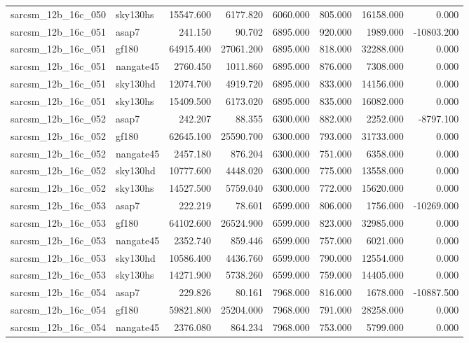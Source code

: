 \begin{tabular}{llrrrrrr}
sarcsm\_12b\_16c\_050 & sky130hs & 15547.600 & 6177.820 & 6060.000 & 805.000 & 16158.000 & 0.000 \\
sarcsm\_12b\_16c\_051 & asap7 & 241.150 & 90.702 & 6895.000 & 920.000 & 1989.000 & -10803.200 \\
sarcsm\_12b\_16c\_051 & gf180 & 64915.400 & 27061.200 & 6895.000 & 818.000 & 32288.000 & 0.000 \\
sarcsm\_12b\_16c\_051 & nangate45 & 2760.450 & 1011.860 & 6895.000 & 876.000 & 7308.000 & 0.000 \\
sarcsm\_12b\_16c\_051 & sky130hd & 12074.700 & 4919.720 & 6895.000 & 833.000 & 14156.000 & 0.000 \\
sarcsm\_12b\_16c\_051 & sky130hs & 15409.500 & 6173.020 & 6895.000 & 835.000 & 16082.000 & 0.000 \\
sarcsm\_12b\_16c\_052 & asap7 & 242.207 & 88.355 & 6300.000 & 882.000 & 2252.000 & -8797.100 \\
sarcsm\_12b\_16c\_052 & gf180 & 62645.100 & 25590.700 & 6300.000 & 793.000 & 31733.000 & 0.000 \\
sarcsm\_12b\_16c\_052 & nangate45 & 2457.180 & 876.204 & 6300.000 & 751.000 & 6358.000 & 0.000 \\
sarcsm\_12b\_16c\_052 & sky130hd & 10777.600 & 4448.020 & 6300.000 & 775.000 & 13558.000 & 0.000 \\
sarcsm\_12b\_16c\_052 & sky130hs & 14527.500 & 5759.040 & 6300.000 & 772.000 & 15620.000 & 0.000 \\
sarcsm\_12b\_16c\_053 & asap7 & 222.219 & 78.601 & 6599.000 & 806.000 & 1756.000 & -10269.000 \\
sarcsm\_12b\_16c\_053 & gf180 & 64102.600 & 26524.900 & 6599.000 & 823.000 & 32985.000 & 0.000 \\
sarcsm\_12b\_16c\_053 & nangate45 & 2352.740 & 859.446 & 6599.000 & 757.000 & 6021.000 & 0.000 \\
sarcsm\_12b\_16c\_053 & sky130hd & 10586.400 & 4436.760 & 6599.000 & 790.000 & 12554.000 & 0.000 \\
sarcsm\_12b\_16c\_053 & sky130hs & 14271.900 & 5738.260 & 6599.000 & 759.000 & 14405.000 & 0.000 \\
sarcsm\_12b\_16c\_054 & asap7 & 229.826 & 80.161 & 7968.000 & 816.000 & 1678.000 & -10887.500 \\
sarcsm\_12b\_16c\_054 & gf180 & 59821.800 & 25204.000 & 7968.000 & 791.000 & 28258.000 & 0.000 \\
sarcsm\_12b\_16c\_054 & nangate45 & 2376.080 & 864.234 & 7968.000 & 753.000 & 5799.000 & 0.000 \\

\end{tabular}
